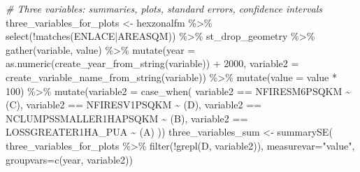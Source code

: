 \documentclass[10pt,landscape,a3paper]{article}
\newenvironment{Shaded}{\begin{snugshade}}{\end{snugshade}}
\newcommand{\AttributeTok}[1]{\textcolor[rgb]{0.77,0.63,0.00}{#1}}
\newcommand{\CommentTok}[1]{\textcolor[rgb]{0.56,0.35,0.01}{\textit{#1}}}
\newcommand{\DecValTok}[1]{\textcolor[rgb]{0.00,0.00,0.81}{#1}}
\newcommand{\FunctionTok}[1]{\textcolor[rgb]{0.00,0.00,0.00}{#1}}
\newcommand{\NormalTok}[1]{#1}
\newcommand{\OtherTok}[1]{\textcolor[rgb]{0.56,0.35,0.01}{#1}}
\newcommand{\SpecialCharTok}[1]{\textcolor[rgb]{0.00,0.00,0.00}{#1}}
\newcommand{\StringTok}[1]{\textcolor[rgb]{0.31,0.60,0.02}{#1}}
\begin{document}
\begin{Shaded}
\begin{Highlighting}[]

\CommentTok{\# Three variables: summaries, plots, standard errors, confidence intervals}
\NormalTok{three\_variables\_for\_plots }\OtherTok{\textless{}{-}}\NormalTok{ hexzonalfm }\SpecialCharTok{\%\textgreater{}\%} 
  \FunctionTok{select}\NormalTok{(}\SpecialCharTok{!}\FunctionTok{matches}\NormalTok{(}\StringTok{\textquotesingle{}ENLACE|AREASQM\textquotesingle{}}\NormalTok{)) }\SpecialCharTok{\%\textgreater{}\%}
\NormalTok{  st\_drop\_geometry }\SpecialCharTok{\%\textgreater{}\%} 
  \FunctionTok{gather}\NormalTok{(variable, value) }\SpecialCharTok{\%\textgreater{}\%} 
  \FunctionTok{mutate}\NormalTok{(}\AttributeTok{year =} \FunctionTok{as.numeric}\NormalTok{(}\FunctionTok{create\_year\_from\_string}\NormalTok{(variable)) }\SpecialCharTok{+} \DecValTok{2000}\NormalTok{,}
         \AttributeTok{variable2 =} \FunctionTok{create\_variable\_name\_from\_string}\NormalTok{(variable)) }\SpecialCharTok{\%\textgreater{}\%} 
  \FunctionTok{mutate}\NormalTok{(}\AttributeTok{value =}\NormalTok{ value }\SpecialCharTok{*} \DecValTok{100}\NormalTok{) }\SpecialCharTok{\%\textgreater{}\%} 
  \FunctionTok{mutate}\NormalTok{(}\AttributeTok{variable2 =} \FunctionTok{case\_when}\NormalTok{(}
\NormalTok{    variable2 }\SpecialCharTok{==} \StringTok{\textquotesingle{}NFIRESM6PSQKM\textquotesingle{}} \SpecialCharTok{\textasciitilde{}} \StringTok{\textquotesingle{}(C)\textquotesingle{}}\NormalTok{,}
\NormalTok{    variable2 }\SpecialCharTok{==} \StringTok{\textquotesingle{}NFIRESV1PSQKM\textquotesingle{}} \SpecialCharTok{\textasciitilde{}} \StringTok{\textquotesingle{}(D)\textquotesingle{}}\NormalTok{,}
\NormalTok{    variable2 }\SpecialCharTok{==} \StringTok{\textquotesingle{}NCLUMPSSMALLER1HAPSQKM\textquotesingle{}} \SpecialCharTok{\textasciitilde{}} \StringTok{\textquotesingle{}(B)\textquotesingle{}}\NormalTok{,}
\NormalTok{    variable2 }\SpecialCharTok{==} \StringTok{\textquotesingle{}LOSSGREATER1HA\_PUA\textquotesingle{}} \SpecialCharTok{\textasciitilde{}} \StringTok{\textquotesingle{}(A)\textquotesingle{}}
\NormalTok{  ))}
\NormalTok{three\_variables\_sum }\OtherTok{\textless{}{-}} \FunctionTok{summarySE}\NormalTok{(}
\NormalTok{  three\_variables\_for\_plots }\SpecialCharTok{\%\textgreater{}\%}
  \FunctionTok{filter}\NormalTok{(}\SpecialCharTok{!}\FunctionTok{grepl}\NormalTok{(}\StringTok{\textquotesingle{}D\textquotesingle{}}\NormalTok{, variable2)),}
  \AttributeTok{measurevar=}\StringTok{"value"}\NormalTok{, }\AttributeTok{groupvars=}\FunctionTok{c}\NormalTok{(}\StringTok{\textquotesingle{}year\textquotesingle{}}\NormalTok{, }\StringTok{\textquotesingle{}variable2\textquotesingle{}}\NormalTok{))}

\end{Highlighting}
\end{Shaded}
\end{document}
